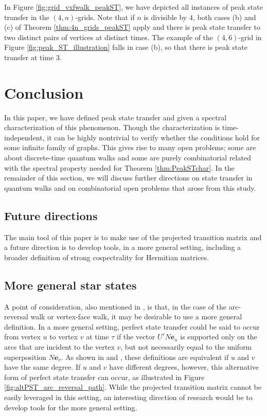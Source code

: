 \documentclass{article}
\numberwithin{equation}{section}
\newcommand\Ze{{\mathbf e}}
\begin{document}
In Figure \ref{fig:grid_vxfwalk_peakST}, we have depicted all instances of peak state transfer in the $(4,n)$-grids. Note that if $n$ is divisible by $4$, both cases (b) and (c) of Theorem \ref{thm:4n_grids_peakST} apply and there is peak state transfer to two distinct pairs of vertices at distinct times. The example of the $(4,6)$-grid in Figure \ref{fig:peak_ST_illustration} falls in case (b), so that there is peak state transfer at time $3$.





\section{Conclusion} \label{sec:openproblems}

In this paper, we have defined peak state transfer and given a spectral characterization of this phenomenon. Though the characterization is time-independent, it can be highly nontrivial to verify whether the conditions hold for some infinite family of graphs. This gives rise to many open problems; some are about discrete-time quantum walks and  some are purely combinatorial related with the spectral property needed for Theorem \ref{thm:PeakSTchar}. In the remainder of this section, we will discuss further directions on state transfer in quantum walks and on combinatorial open problems that arose from this study.

\subsection{Future directions}

The main tool of this paper is to make use of the projected transition matrix and a future direction is to develop  tools, in a more general setting, including a broader definition of strong cospectrality for Hermitian matrices. 


\subsection*{More general star states }
A point of consideration, also mentioned in \cite{GuoSch2024}, 
is that, in the case of the arc-reversal walk or vertex-face walk, it may be desirable to use a more general definition. In  a more general setting, perfect state transfer could be said to  occur from vertex $u$ to vertex $v$ at time $\tau$ if the vector $U^\tau N\Ze_u$ is supported only on the arcs that are incident to the vertex $v$, but not necessarily equal to the uniform superposition $N\Ze_v$. As shown in \cite{GodZha2023} and \cite{GuoSch2024}, these definitions are equivalent if $u$ and $v$ have the same degree. If $u$ and $v$ have different degrees, however, this alternative form of perfect state transfer can occur, as illustrated in Figure \ref{fig:altPST_arc_reversal_path}. While the projected transition matrix cannot be easily leveraged in this setting, an interesting direction of research would be to develop tools for the more general setting. 
\end{document}
